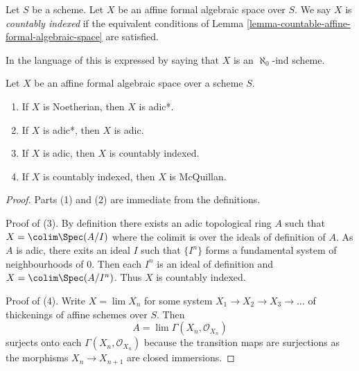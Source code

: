 \begin{definition}
\label{definition-countable}
Let $S$ be a scheme. Let $X$ be an affine formal algebraic space over $S$.
We say $X$ is {\it countably indexed} if the equivalent conditions of
Lemma \ref{lemma-countable-affine-formal-algebraic-space} are satisfied.
\end{definition}

\noindent
In the language of \cite{BVGD} this is expressed by saying that
$X$ is an $\aleph_0$-ind scheme.

\begin{lemma}
\label{lemma-implications-between-types}
Let $X$ be an affine formal algebraic space over a scheme $S$.
\begin{enumerate}
\item If $X$ is Noetherian, then $X$ is adic*.
\item If $X$ is adic*, then $X$ is adic.
\item If $X$ is adic, then $X$ is countably indexed.
\item If $X$ is countably indexed, then $X$ is McQuillan.
\end{enumerate}
\end{lemma}

\begin{proof}
Parts (1) and (2) are immediate from the definitions.

\medskip\noindent
Proof of (3). By definition there exists an adic topological ring $A$
such that $X = \colim \Spec(A/I)$ where the colimit is over the ideals
of definition of $A$. As $A$ is adic, there exits an ideal $I$
such that $\{I^n\}$ forms a fundamental system of neighbourhoods of $0$.
Then each $I^n$ is an ideal of definition and $X = \colim \Spec(A/I^n)$.
Thus $X$ is countably indexed.

\medskip\noindent
Proof of (4). Write $X = \lim X_n$
for some system $X_1 \to X_2 \to X_3 \to \ldots$ of thickenings of affine
schemes over $S$. Then
$$
A = \lim \Gamma(X_n, \mathcal{O}_{X_n})
$$
surjects onto each $\Gamma(X_n, \mathcal{O}_{X_n})$ because the transition
maps are surjections as the morphisms $X_n \to X_{n + 1}$ are closed
immersions.
\end{proof}

